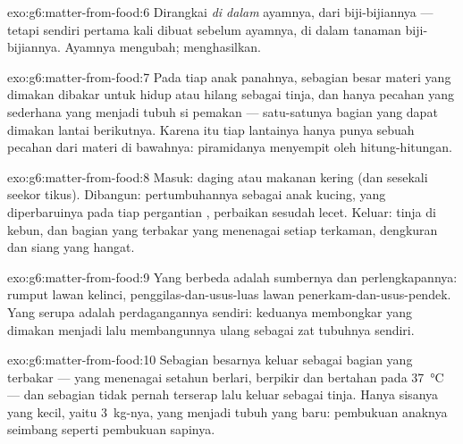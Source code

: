 \begin{solution}{exo:g6:matter-from-food:6}
Dirangkai \emph{di dalam} ayamnya, dari  biji-bijiannya ---
tetapi  sendiri pertama kali dibuat sebelum ayamnya,
di dalam  tanaman biji-bijiannya. Ayamnya mengubah; 
menghasilkan.
\end{solution}

\begin{solution}{exo:g6:matter-from-food:7}
Pada tiap anak panahnya, sebagian besar materi yang dimakan dibakar
untuk hidup atau hilang sebagai tinja, dan hanya pecahan yang sederhana
yang menjadi tubuh si pemakan --- satu-satunya bagian yang dapat
dimakan lantai berikutnya. Karena itu tiap lantainya hanya punya
sebuah pecahan dari materi di bawahnya: piramidanya menyempit oleh
hitung-hitungan.
\end{solution}

\begin{solution}{exo:g6:matter-from-food:8}
Masuk: daging atau makanan kering (dan sesekali seekor tikus).
Dibangun: pertumbuhannya sebagai anak kucing,  yang diperbaruinya
pada tiap pergantian , perbaikan sesudah lecet. Keluar: tinja di
kebun, dan bagian yang terbakar yang menenagai setiap terkaman,
dengkuran dan  siang yang hangat.
\end{solution}

\begin{solution}{exo:g6:matter-from-food:9}
Yang berbeda adalah sumbernya dan perlengkapannya: rumput lawan
kelinci, penggilas-dan-usus-luas lawan penerkam-dan-usus-pendek. Yang
serupa adalah perdagangannya sendiri: keduanya membongkar  yang dimakan menjadi  lalu membangunnya ulang sebagai
zat tubuhnya sendiri.
\end{solution}

\begin{solution}{exo:g6:matter-from-food:10}
Sebagian besarnya keluar sebagai bagian yang terbakar --- yang
menenagai setahun berlari, berpikir dan bertahan pada
\qty{37}{\degreeCelsius} --- dan sebagian tidak pernah terserap lalu
keluar sebagai tinja. Hanya sisanya yang kecil, yaitu
\qty{3}{kg}-nya, yang menjadi tubuh yang baru: pembukuan anaknya
seimbang seperti pembukuan sapinya.
\end{solution}

